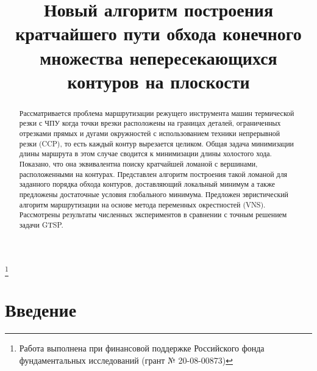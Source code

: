 \documentclass[12pt]{a&t}
\begin{document}
\title{
  Новый алгоритм построения кратчайшего пути обхода
  конечного множества непересекающихся контуров на плоскости
}%
\thanks{
  Работа выполнена при финансовой поддержке
  Российского фонда фундаментальных исследований
  (грант № 20-08-00873)
}


\maketitle

\begin{abstract}
Рассматривается проблема маршрутизации режущего
инструмента машин термической резки с ЧПУ
когда точки врезки расположены
на границах деталей,
ограниченных отрезками прямых и дугами окружностей
с использованием техники непрерывной резки
(CCP),
то есть каждый контур вырезается целиком.
Общая задача минимизации длины маршрута
в этом случае сводится к минимизации длины холостого хода.
Показано, что она эквивалентна поиску
кратчайшей ломаной с вершинами,
расположенными на контурах.
Представлен алгоритм построения
такой ломаной для заданного порядка
обхода контуров,
доставляющий локальный минимум
а также предложены достаточные условия
глобального минимума.
Предложен эвристический алгоритм
маршрутизации на основе
метода переменных окрестностей
(VNS).
Рассмотрены результаты численных экспериментов
в сравнении с точным решением задачи GTSP.
\end{abstract}

\section{Введение}



\end{document}
